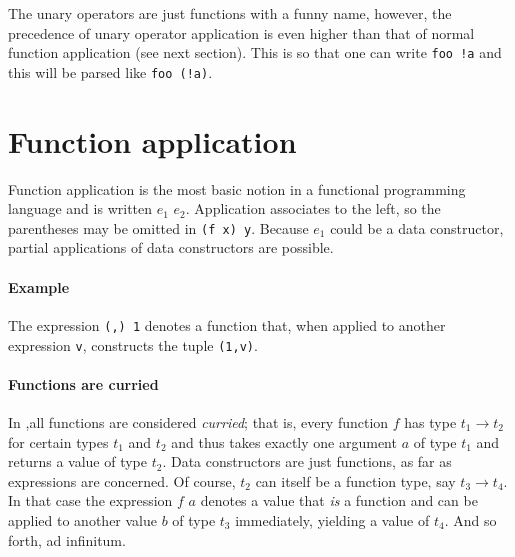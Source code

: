 The unary operators are just functions with a funny name, however, the precedence of unary operator application is even higher than that of normal function application (see next section). This is so that one can write \texttt{foo !a} and this will be parsed like \texttt{foo (!a)}.


\section{Function application}  \label{funapp} 

\begin{flushleft}
  \alt {} 
\end{flushleft}

Function application is the most basic notion in a functional programming language and is written $e_1$ $e_2$.
Application associates to the left, so the parentheses may be omitted in \texttt{(f x) y}.
Because $e_1$ could be a data constructor, partial applications of data constructors are possible.

\paragraph{Example}
The expression \texttt{(,) 1}
denotes a function that, when applied to another expression \texttt{v}, constructs the tuple \texttt{(1,v)}.


\paragraph*{Functions are curried}

In \frege{},all functions are considered \emph{curried}; that is, every function $f$ has type $t_1 \rightarrow{} t_2$ for certain types $t_1$ and $t_2$ and thus takes exactly one argument $a$ of type $t_1$ and returns a value of type $t_2$.
Data constructors are just functions, as far as expressions are concerned.
Of course, $t_2$ can itself be a function type, say $t_3 \rightarrow{} t_4$.
In that case the expression $f$ $a$ denotes a value that \emph{is} a function and can be applied to another value $b$ of type $t_3$ immediately, yielding a value of $t_4$. And so forth, ad infinitum.

